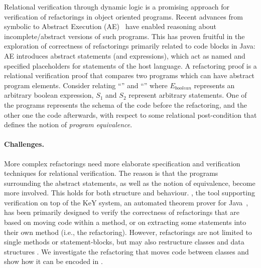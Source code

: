 
Relational verification through dynamic logic is a promising approach for verification of refactorings in object oriented programs.
Recent advances from symbolic to Abstract Execution (AE)~\cite{DBLP:conf/fm/SteinhofelH19} have enabled reasoning about incomplete/abstract versions of such programs.
This has proven fruitful in the exploration of correctness of refactorings primarily related to code blocks in Java:
%
AE introduces abstract statements (and expressions), which act as named and specified placeholders for statements of the host language.
A refactoring proof is a relational verification proof that compares two programs which can have abstract program elements.
Consider relating ``'' and ``'' where
$E_{\mathit{boolean}}$ represents an arbitrary boolean expression, $S_1$ and $S_2$ represent arbitrary statements.
One of the programs represents the schema of the code before the refactoring, and the other one the code afterwards, with respect to some relational post-condition that defines the notion of \emph{program equivalence}.


\paragraph{Challenges.}
More complex refactorings need more elaborate specification and verification techniques for relational verification. 
The reason is that the programs surrounding the abstract statements, as well as the notion of equivalence, become more involved.
This holds for both structure and behaviour.
\Refinity{} \cite{steinhoefel:ae}, the tool supporting verification on top of the KeY system, an automated theorem prover for Java~\cite{DBLP:conf/aplas/Steinhofel20},
has been primarily designed to verify the correctness of refactorings that are based on moving code within a method, or on extracting some statements into their own method (i.e., the  refactoring).
However, refactorings are not limited to single methods or statement-blocks, but may also restructure classes and data structures \cite{fowler:refactoring}.
We investigate the  refactoring that moves code between classes and show how it can be encoded in \Refinity{}.


